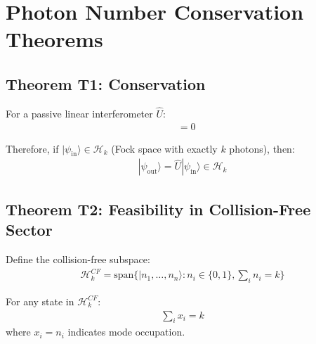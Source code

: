 \documentclass{article}
\begin{document}
\section{Photon Number Conservation Theorems}

\subsection{Theorem T1: Conservation}

For a passive linear interferometer $\hat{U}$:
\begin{align}
    [\hat{U}, \hat{N}] &= 0
\end{align}

Therefore, if $|\psi_{\text{in}}\rangle \in \mathcal{H}_k$ (Fock space with exactly $k$ photons), then:
\begin{align}
    |\psi_{\text{out}}\rangle = \hat{U}|\psi_{\text{in}}\rangle \in \mathcal{H}_k
\end{align}

\subsection{Theorem T2: Feasibility in Collision-Free Sector}

Define the collision-free subspace:
\begin{align}
    \mathcal{H}_k^{CF} = \text{span}\{|n_1, \ldots, n_n\rangle : n_i \in \{0,1\}, \sum_i n_i = k\}
\end{align}

For any state in $\mathcal{H}_k^{CF}$:
\begin{align}
    \sum_i x_i = k
\end{align}
where $x_i = n_i$ indicates mode occupation.
\end{document}
